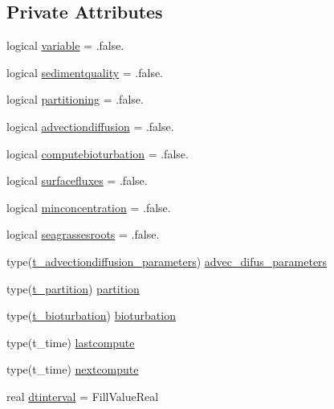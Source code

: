 \subsection*{Private Attributes}
\begin{DoxyCompactItemize}
\item 
logical \mbox{\hyperlink{structmodulesedimentproperties_1_1t__evolution_ad5c3d3ae000d4eb63fa8c41d59d59722}{variable}} = .false.
\item 
logical \mbox{\hyperlink{structmodulesedimentproperties_1_1t__evolution_ab2e62b7fb3320a96581a1e446a6cb9f2}{sedimentquality}} = .false.
\item 
logical \mbox{\hyperlink{structmodulesedimentproperties_1_1t__evolution_ab39ca8b3a23ead1a335127b31678ff4e}{partitioning}} = .false.
\item 
logical \mbox{\hyperlink{structmodulesedimentproperties_1_1t__evolution_abe09f93a9867a0721e198a5ff453a00b}{advectiondiffusion}} = .false.
\item 
logical \mbox{\hyperlink{structmodulesedimentproperties_1_1t__evolution_aae41569ae99635247fc753dd45dba1e1}{computebioturbation}} = .false.
\item 
logical \mbox{\hyperlink{structmodulesedimentproperties_1_1t__evolution_aec1adaa86545cb6683153ee372de6886}{surfacefluxes}} = .false.
\item 
logical \mbox{\hyperlink{structmodulesedimentproperties_1_1t__evolution_ae0d1a3b9d2c1a5ce944c0d4fe405dce0}{minconcentration}} = .false.
\item 
logical \mbox{\hyperlink{structmodulesedimentproperties_1_1t__evolution_afce8e8121833b58c959031c845703f85}{seagrassesroots}} = .false.
\item 
type(\mbox{\hyperlink{structmodulesedimentproperties_1_1t__advectiondiffusion__parameters}{t\+\_\+advectiondiffusion\+\_\+parameters}}) \mbox{\hyperlink{structmodulesedimentproperties_1_1t__evolution_a6a556c1d9bba3625fcd681ac9a6a177f}{advec\+\_\+difus\+\_\+parameters}}
\item 
type(\mbox{\hyperlink{structmodulesedimentproperties_1_1t__partition}{t\+\_\+partition}}) \mbox{\hyperlink{structmodulesedimentproperties_1_1t__evolution_ae8b5b6da938e0931e40f427a0ccfcf30}{partition}}
\item 
type(\mbox{\hyperlink{structmodulesedimentproperties_1_1t__bioturbation}{t\+\_\+bioturbation}}) \mbox{\hyperlink{structmodulesedimentproperties_1_1t__evolution_a3ddfd8df2c4dc5ca655896cd16fc5f76}{bioturbation}}
\item 
type(t\+\_\+time) \mbox{\hyperlink{structmodulesedimentproperties_1_1t__evolution_a436159cfb8708ac2a2cc55548f403800}{lastcompute}}
\item 
type(t\+\_\+time) \mbox{\hyperlink{structmodulesedimentproperties_1_1t__evolution_a7575f14ff4cbc4f13618c9cdbe52a5ca}{nextcompute}}
\item 
real \mbox{\hyperlink{structmodulesedimentproperties_1_1t__evolution_ae705699b1ae40ebca430da37f4764c2a}{dtinterval}} = Fill\+Value\+Real
\end{DoxyCompactItemize}


